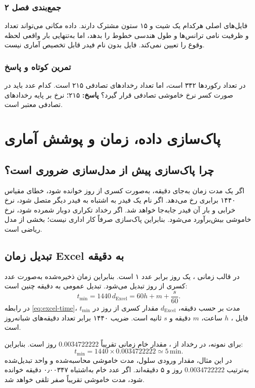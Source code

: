 \documentclass[11pt,a4paper,oneside]{book}
\newcommand{\file}[1]{\lr{\texttt{#1}}}
\newcommand{\code}[1]{\lr{\texttt{#1}}}
\newcommand{\unit}[1]{\,\mathrm{#1}}
\newcommand{\summary}[1]{\subsection*{جمع‌بندی فصل #1}}
\newcommand{\exercise}{\subsection*{تمرین کوتاه و پاسخ}}
\newcommand{\answer}{\noindent\textbf{پاسخ:} }
\begin{document}
\summary{۲}
فایل‌های اصلی هرکدام یک شیت \code{Outages} و ۱۵ ستون مشترک دارند. داده مکانی می‌تواند تعداد و ظرفیت نامی ترانس‌ها و طول هندسی خطوط را بدهد، اما به‌تنهایی بار واقعی لحظه وقوع را تعیین نمی‌کند. فایل بدون نام فیدر قابل تخصیص آماری نیست.

\exercise
در \file{5.xlsx} تعداد رکوردها ۳۴۲ است، اما تعداد رخدادهای تصادفی ۲۱۵ است. کدام عدد باید در صورت کسر نرخ خاموشی تصادفی قرار گیرد؟
\answer ۲۱۵؛ نرخ بر پایه رخدادهای تصادفی معتبر است.

\chapter{پاک‌سازی داده، زمان و پوشش آماری}
\section{چرا پاک‌سازی پیش از مدل‌سازی ضروری است؟}
اگر یک مدت زمان به‌جای دقیقه، به‌صورت کسری از روز  خوانده شود، خطای مقیاس ۱۴۴۰ برابری رخ می‌دهد. اگر نام یک فیدر به اشتباه به فیدر دیگر متصل شود، نرخ خرابی و بار آن فیدر جابه‌جا خواهد شد. اگر رخداد تکراری دوبار شمرده شود، نرخ خاموشی بیش‌برآورد می‌شود. بنابراین پاک‌سازی صرفاً کار اداری نیست؛ بخشی از مدل ریاضی است.

\section{تبدیل زمان Excel به دقیقه}
در قالب زمانی ، یک روز برابر عدد ۱ است. بنابراین زمان ذخیره‌شده به‌صورت عدد کسری از روز تبدیل می‌شود. تبدیل عمومی به دقیقه چنین است:
\begin{equation}
 t_{\min}=1440\,d_{\mathrm{Excel}}=60h+m+\frac{s}{60}.
 \label{eq:excel-time}
\end{equation}
در رابطه \eqref{eq:excel-time}، $t_{\min}$ مدت بر حسب دقیقه، $d_{\mathrm{Excel}}$ مقدار کسری از روز در فایل ، $h$ ساعت، $m$ دقیقه و $s$ ثانیه است. ضریب ۱۴۴۰ برابر تعداد دقیقه‌های شبانه‌روز است.

برای نمونه، در رخداد  از \file{5.xlsx}، مقدار خام زمانی تقریباً $0.0034722222$ روز است. بنابراین:
\begin{equation}
 t_{\min}=1440\times0.0034722222\simeq5\unit{min}.
 \label{eq:f5-time-example}
\end{equation}
در این مثال، مقدار ورودی سلول، مدت خاموشی محاسبه‌شده و واحد تبدیل‌شده به‌ترتیب $0.0034722222$ روز و ۵ دقیقه‌اند. اگر عدد خام به‌اشتباه ۰٫۰۰۳۴۷ دقیقه خوانده شود، مدت خاموشی تقریباً صفر تلقی خواهد شد.
\end{document}
